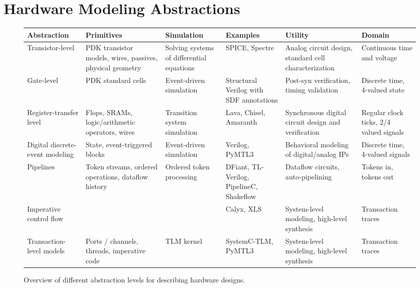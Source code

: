\documentclass[sigplan,review,nonacm]{acmart}
\begin{document}

\maketitle

\section{Hardware Modeling Abstractions}

\begin{figure*}[!hbt]
\small
\begin{tabular}{p{2cm}p{3cm}p{2cm}p{3cm}p{3cm}p{2cm}}\toprule
\textbf{Abstraction} & \textbf{Primitives} & \textbf{Simulation} & \textbf{Examples} & \textbf{Utility} & \textbf{Domain} \\\midrule
Transistor-level & PDK transistor models, wires, passives, physical geometry & Solving systems of differential equations & SPICE, Spectre & Analog circuit design, standard cell characterization & Continuous time and voltage\\\midrule
Gate-level & PDK standard cells & Event-driven simulation & Structural Verilog with SDF annotations & Post-syn verification, timing validation & Discrete time, 4-valued state\\\midrule
Register-transfer level & Flops, SRAMs, logic/arithmetic operators, wires & Transition system simulation & Lava\cite{lava}, Chisel\cite{chisel}, Amaranth\cite{amaranth} & Synchronous digital circuit design and verification & Regular clock ticks, 2/4 valued signals\\\midrule
Digital discrete-event modeling & State, event-triggered blocks & Event-driven simulation & Verilog, PyMTL3\cite{pymtl3} & Behavioral modeling of digital/analog IPs & Discrete time, 4-valued signals\\\midrule
Pipelines & Token streams, ordered operations, dataflow history & Ordered token processing & DFiant\cite{dfiant}, TL-Verilog\cite{tlverilog}, PipelineC\cite{pipelinec}, Shakeflow\cite{shakeflow} & Dataflow circuits, auto-pipelining & Tokens in, tokens out\\\midrule
Imperative control flow & &  & Calyx\cite{calyx}, XLS\cite{xls} & System-level modeling, high-level synthesis & Transaction traces\\\bottomrule
Transaction-level models & Ports / channels, threads, imperative code & TLM kernel & SystemC-TLM, PyMTL3 & System-level modeling, high-level synthesis & Transaction traces\\\bottomrule
\end{tabular}
\caption{Overview of different abstraction levels for describing hardware designs.}
\label{fig:abstractions}
\end{figure*}
\end{document}
